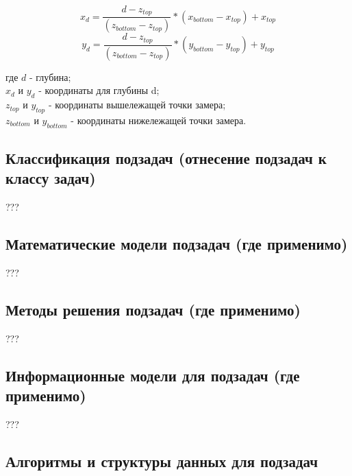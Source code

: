 $$ x_d = \frac{d-z_{top}}{(z_{bottom}-z_{top})}*(x_{bottom}-x_{top})+x_{top} $$
$$ y_d = \frac{d-z_{top}}{(z_{bottom}-z_{top})}*(y_{bottom}-y_{top})+y_{top} $$

где $ d $ - глубина;\\
$ x_d $ и $ y_d $ - координаты для глубины d; \\
$ z_{top} $ и $ y_{top} $ - координаты вышележащей точки замера;\\
$ z_{bottom} $ и $ y_{bottom} $ - координаты нижележащей точки замера.

\subsection{Классификация подзадач (отнесение подзадач к классу задач)}
???

\subsection{Математические модели подзадач (где применимо)}
???

\subsection{Методы решения подзадач (где применимо)}
???

\subsection{Информационные модели для подзадач (где применимо)}
???

\subsection{Алгоритмы и структуры данных для подзадач}
